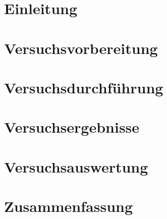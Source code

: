 %



%


\pagestyle{empty}

%
\tableofcontents
%
\newpage
\pagestyle{headings}
%
\section{Einleitung}
\label{sec:Einleitung}

\clearpage
%
\section{Versuchsvorbereitung}
\label{sec:Vorbereitung}

\clearpage
%
\section{Versuchsdurchführung}
\label{sec:Durchführung}

\clearpage
%
\section{Versuchsergebnisse}
\label{sec:Ergebnisse}

\clearpage
%
\section{Versuchsauswertung}
\label{sec:Auswertung}

\clearpage
%
\section{Zusammenfassung}
\label{sec:Zusammenfassung}

\clearpage
%
\listoftables
\newpage
%
\listoffigures
\newpage
%
\lstlistoflistings
\newpage
%

\newpage
%
\appendices

%

%
